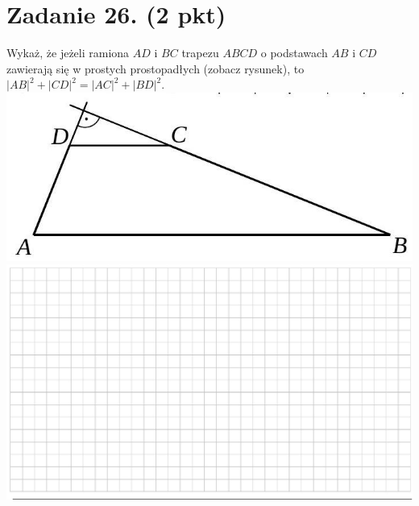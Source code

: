 \documentclass[10pt]{article}
\begin{document}
\section*{Zadanie 26. (2 pkt)}
Wykaż, że jeżeli ramiona \(A D\) i \(B C\) trapezu \(A B C D\) o podstawach \(A B\) i \(C D\) zawierają się w prostych prostopadłych (zobacz rysunek), to \(|A B|^{2}+|C D|^{2}=|A C|^{2}+|B D|^{2}\).\\
\includegraphics[max width=\textwidth, center]{2024_11_21_2c2c97b7feae6d70b078g-10}\\
\includegraphics[max width=\textwidth, center]{2024_11_21_2c2c97b7feae6d70b078g-10(1)}
\end{document}
